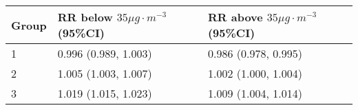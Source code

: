 \begin{tabular}{lll}
  \hline
Group & RR below $35 \mu g \cdot m^{-3}$ (95\%CI) & RR above $35 \mu g \cdot m^{-3}$ (95\%CI) \\ 
  \hline
   1 & 0.996 (0.989, 1.003) & 0.986 (0.978, 0.995) \\ 
     2 & 1.005 (1.003, 1.007) & 1.002 (1.000, 1.004) \\ 
     3 & 1.019 (1.015, 1.023) & 1.009 (1.004, 1.014) \\ 
   \hline
\end{tabular}


